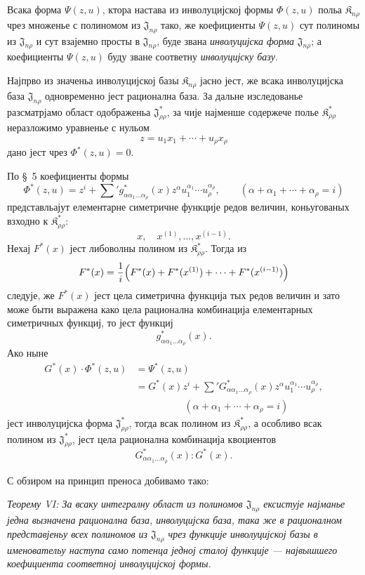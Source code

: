 ﻿\documentclass[11pt]{article}
\providecommand{\Kfield}{\mathfrak{K}}
\providecommand{\Jdom}{\mathfrak{J}}
\begin{document}
Всака форма $\Psi(z,u)$, ктора настава из инволуцијској формы $\Phi(z,u)$ польа $\Kfield_{n\rho}$ чрез множенье с полиномом из $\Jdom_{n\rho}$ тако, же коефициенты $\Psi(z,u)$ сут полиномы из $\Jdom_{n\rho}$ и сут взајемно просты в $\Jdom_{n\rho}$, буде звана {\itshape инволуцијска форма} $\Jdom_{n\rho}$; а коефициенты $\Psi(z,u)$ буду зване соответну {\itshape инволуцијску базу}.

Најпрво из значеньа инволуцијској базы $\Kfield_{n\rho}$ јасно јест, же всака инволуцијска база $\Jdom_{n\rho}$ одновременно јест рационална база. За дальне изследованье разсматрјамо област одображеньа $\Jdom^*_{\rho\rho}$, за чије најменше содержече полье $\Kfield^*_{\rho\rho}$ неразложимо уравненье с нульом
\[
  z=u_1x_1+\cdots+u_\rho x_\rho
\]
дано јест чрез $\Phi^*(z,u)=0$.

По \S\ 5 коефициенты формы
\[
  \Phi^*(z,u)=z^i+\sum{}' g^*_{\alpha\alpha_1\ldots\alpha_\rho}(x)
  z^\alpha u_1^{\alpha_1}\cdots u_\rho^{\alpha_\rho},
  \qquad
  (\alpha+\alpha_1+\cdots+\alpha_\rho=i)
\]
представльајут елементарне симетричне функције редов величин, коньугованых взходно к $\Kfield^*_{\rho\rho}$:
\[
  x,\quad x^{(1)},\ldots,x^{(i-1)}.
\]
Нехај $F^*(x)$ јест либоволны полином из $\Kfield^*_{\rho\rho}$. Тогда из
\[
  F^*(x)=\frac1i\Bigl(F^*(x)+F^*(x^{(1)})+
  \cdots+F^*(x^{(i-1)})\Bigr)
\]
следује, же $F^*(x)$ јест цела симетрична функција тых редов величин и зато може быти выражена како цела рационална комбинација елементарных симетричных функциј, то јест функциј
\[
  g^*_{\alpha\alpha_1\ldots\alpha_\rho}(x).
\]
Ако ныне
\[
\begin{aligned}
  G^*(x)\cdot\Phi^*(z,u)
  &=\Psi^*(z,u)\\
  &=G^*(x)z^i+
    \sum{}'G^*_{\alpha\alpha_1\ldots\alpha_\rho}(x)
    z^\alpha u_1^{\alpha_1}\cdots u_\rho^{\alpha_\rho},\\
  &\hspace{5em}(\alpha+\alpha_1+\cdots+\alpha_\rho=i)
\end{aligned}
\]
јест инволуцијска форма $\Jdom^*_{\rho\rho}$, тогда всак полином из $\Kfield^*_{\rho\rho}$, а особливо всак полином из $\Jdom^*_{\rho\rho}$, јест цела рационална комбинација квоциентов
\[
  G^*_{\alpha\alpha_1\ldots\alpha_\rho}(x):G^*(x).
\]

С обзиром на принцип преноса добивамо тако:

{\itshape Теорему VI: За всаку интегралну област из полиномов $\Jdom_{n\rho}$ ексистује најманье једна вызначена рационална база, инволуцијска база, така же в рационалном представјеньу всех полиномов из $\Jdom_{n\rho}$ чрез функције инволуцијској базы в именовательу наступа само потенца једној сталој функције --- највышшего коефициента соответној инволуцијској формы.}
\end{document}
